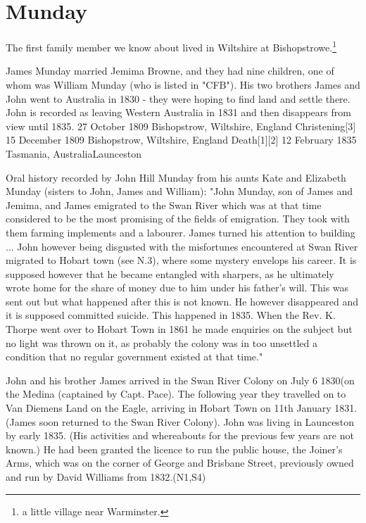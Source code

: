 \section{Munday}

The first family member we know about lived in Wiltshire at Bishopstrowe.\footnote{a little village near Warminster.}

James Munday married Jemima Browne, and they had nine children, one of whom was William Munday (who is listed in "CFB").  His two brothers James and John went to Australia in 1830 - they were hoping  to find land and settle there.  
John is recorded as leaving Western Australia in 1831 and then disappears from view until 1835.   	27 October 1809 	Bishopstrow, Wiltshire, England
Christening[3] 	15 December 1809 	Bishopstrow, Wiltshire, England
Death[1][2] 	12 February 1835 	Tasmania, AustraliaLaunceston

Oral history recorded by John Hill Munday from his aunts Kate and Elizabeth Munday (sisters to John, James and William): "John Munday, son of James and Jemima, and James emigrated to the Swan River which was at that time considered to be the most promising of the fields of emigration. They took with them farming implements and a labourer. James turned his attention to building ... John however being disgusted with the misfortunes encountered at Swan River migrated to Hobart town (see N.3), where some mystery envelops his career. It is supposed however that he became entangled with sharpers, as he ultimately wrote home for the share of money due to him under his father's will. This was sent out but what happened after this is not known. He however disappeared and it is supposed committed suicide. This happened in 1835. When the Rev. K. Thorpe went over to Hobart Town in 1861 he made enquiries on the subject but no light was thrown on it, as probably the colony was in too unsettled a condition that no regular government existed at that time."

John and his brother James arrived in the Swan River Colony on July 6 1830(on the Medina (captained by Capt. Pace). The following year they travelled on to Van Diemens Land on the Eagle, arriving in Hobart Town on 11th January 1831.(James soon returned to the Swan River Colony). John was living in Launceston by early 1835. (His activities and whereabouts for the previous few years are not known.) He had been granted the licence to run the public house, the Joiner's Arms, which was on the corner of George and Brisbane Street, previously owned and run by David Williams from 1832.(N1,S4)

